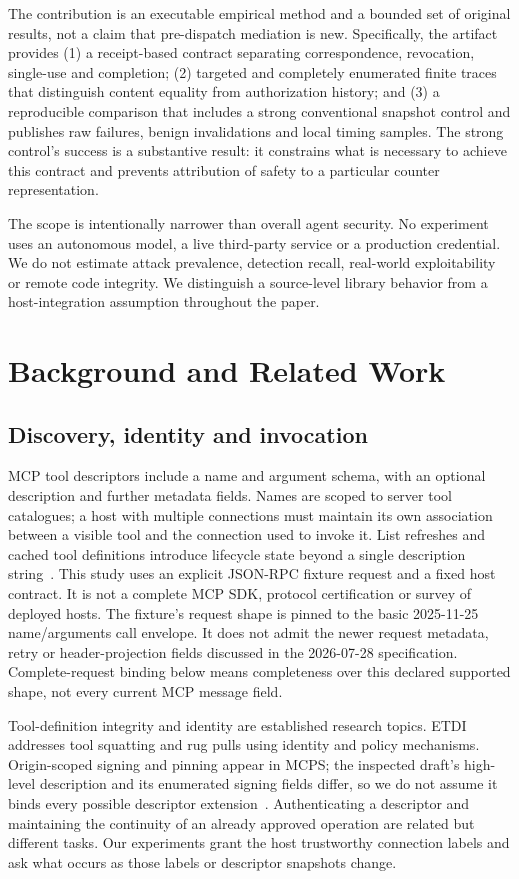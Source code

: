 The contribution is an executable empirical method and a bounded set of original
results, not a claim that pre-dispatch mediation is new. Specifically, the artifact
provides (1) a receipt-based contract separating correspondence, revocation,
single-use and completion; (2) targeted and completely enumerated finite traces
that distinguish content equality from authorization history; and (3) a reproducible
comparison that includes a strong conventional snapshot control and publishes raw
failures, benign invalidations and local timing samples. The strong control's
success is a substantive result: it constrains what is necessary to achieve this
contract and prevents attribution of safety to a particular counter representation.

The scope is intentionally narrower than overall agent security. No experiment
uses an autonomous model, a live third-party service or a production credential.
We do not estimate attack prevalence, detection recall, real-world exploitability
or remote code integrity. We distinguish a source-level library behavior from a
host-integration assumption throughout the paper.

\section{Background and Related Work}
\subsection{Discovery, identity and invocation}
MCP tool descriptors include a name and argument schema, with an optional
description and further metadata fields. Names are scoped to server tool
catalogues; a host with multiple connections must maintain its own association
between a visible tool and the connection used to invoke it. List refreshes and
cached tool definitions introduce lifecycle state beyond a single description
string~\cite{mcp2025tools,mcp2026tools,mcpcaching}. This study uses an explicit
JSON-RPC fixture request and a fixed host contract. It is not a complete MCP SDK,
protocol certification or survey of deployed hosts. The fixture's request shape
is pinned to the basic 2025-11-25 name/arguments call envelope. It does not admit
the newer request metadata, retry or header-projection fields discussed in the
2026-07-28 specification. Complete-request binding below means completeness over
this declared supported shape, not every current MCP message field.

Tool-definition integrity and identity are established research topics. ETDI
addresses tool squatting and rug pulls using identity and policy mechanisms.
Origin-scoped signing and pinning appear in MCPS; the inspected draft's high-level
description and its enumerated signing fields differ, so we do not assume it binds
every possible descriptor extension~\cite{etdi,mcps}. Authenticating a descriptor
and maintaining the continuity of an already approved operation are related but
different tasks. Our experiments grant the host trustworthy connection labels and
ask what occurs as those labels or descriptor snapshots change.

